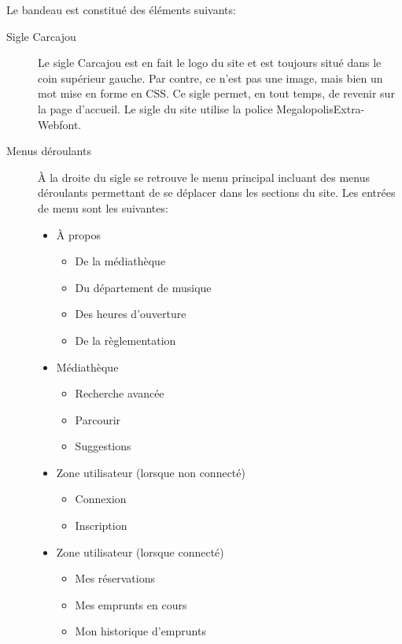 \documentclass[letter, 11pt]{report}
\begin{document}
Le bandeau est constitué des éléments suivants:
\begin{description}
	\item[Sigle Carcajou] Le sigle Carcajou est en fait le logo du site et est toujours situé dans le coin supérieur gauche. Par contre, ce n'est pas une image, mais bien un mot mise en forme en CSS. Ce sigle permet, en tout temps, de revenir sur la page d'accueil. Le sigle du site utilise la police MegalopolisExtra-Webfont.
	\item[Menus déroulants]À la droite du sigle se retrouve le menu principal incluant des menus déroulants permettant de se déplacer dans les sections du site. Les entrées de menu sont les suivantes:
		\begin{itemize}
			\item À propos
			\begin{itemize}
				\item De la médiathèque
				\item Du département de musique
				\item Des heures d'ouverture
				\item De la règlementation
			\end{itemize}
		\end{itemize}
		\begin{itemize}
			\item Médiathèque
			\begin{itemize}
				\item Recherche avancée
				\item Parcourir
				\item Suggestions
			\end{itemize}
		\end{itemize}
		\begin{itemize}
			\item Zone utilisateur (lorsque non connecté)
			\begin{itemize}
				\item Connexion
				\item Inscription
			\end{itemize}
		\end{itemize}
		\begin{itemize}
			\item Zone utilisateur (lorsque connecté)
			\begin{itemize}
				\item Mes réservations
				\item Mes emprunts en cours
				\item Mon historique d'emprunts

\end{itemize}
\end{itemize}
\end{description}
\end{document}
